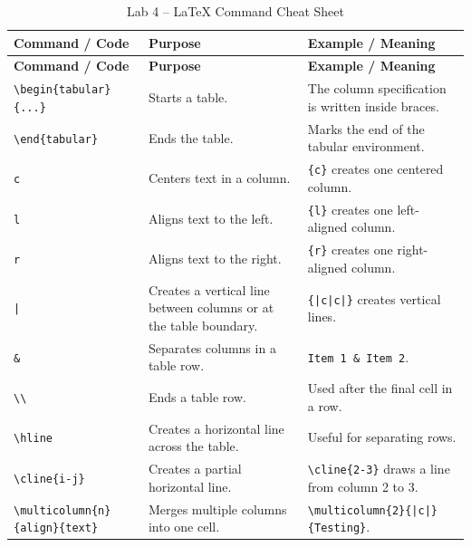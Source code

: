 \documentclass[a4paper,10pt]{article}
\begin{document}
\begin{longtable}{p{} p{} p{}}
\caption{Lab 4 -- LaTeX Command Cheat Sheet}
\\
\toprule
\textbf{Command / Code} &
\textbf{Purpose} &
\textbf{Example / Meaning}
\\
\midrule
\endfirsthead

\toprule
\textbf{Command / Code} &
\textbf{Purpose} &
\textbf{Example / Meaning}
\\
\midrule
\endhead

\bottomrule
\endfoot

\texttt{\textbackslash begin\{tabular\}\{...\}} &
Starts a table. &
The column specification is written inside braces.
\\

\texttt{\textbackslash end\{tabular\}} &
Ends the table. &
Marks the end of the tabular environment.
\\

\texttt{c} &
Centers text in a column. &
\texttt{\{c\}} creates one centered column.
\\

\texttt{l} &
Aligns text to the left. &
\texttt{\{l\}} creates one left-aligned column.
\\

\texttt{r} &
Aligns text to the right. &
\texttt{\{r\}} creates one right-aligned column.
\\

\texttt{|} &
Creates a vertical line between columns or at the table boundary. &
\texttt{\{|c|c|\}} creates vertical lines.
\\

\texttt{\&} &
Separates columns in a table row. &
\texttt{Item 1 \& Item 2}.
\\

\texttt{\textbackslash\textbackslash} &
Ends a table row. &
Used after the final cell in a row.
\\

\texttt{\textbackslash hline} &
Creates a horizontal line across the table. &
Useful for separating rows.
\\

\texttt{\textbackslash cline\{i-j\}} &
Creates a partial horizontal line. &
\texttt{\textbackslash cline\{2-3\}} draws a line from column 2 to 3.
\\

\texttt{\textbackslash multicolumn\{n\}\{align\}\{text\}} &
Merges multiple columns into one cell. &
\texttt{\textbackslash multicolumn\{2\}\{|c|\}\{Testing\}}.
\\


\end{longtable}
\end{document}
